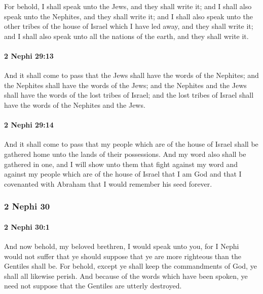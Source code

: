 			For behold, I shall speak unto the Jews, and they shall write it;
			and I shall also speak unto the Nephites, and they shall write it;
			and I shall also speak unto the other tribes of the house of Israel
			which I have led away,
			and they shall write it;
			and I shall also speak unto all the nations of the earth,
			and they shall write it.

		\paragraph{2 Nephi 29:13} %
			\label{2NEPHI-29-13}

			And it shall come to pass that the Jews shall have the words of the Nephites;
			and the Nephites shall have the words of the Jews;
			and the Nephites and the Jews shall have the words of the lost tribes of Israel;
			and the lost tribes of Israel shall have the words of the Nephites and the Jews.

		\paragraph{2 Nephi 29:14} %
			\label{2NEPHI-29-14}

			And it shall come to pass that
			my people which are of the house of Israel shall be gathered home
			unto the lands of their possessions.
			And my word also shall be gathered in one,
			and I will show unto them that fight against my word
			and against my people which are of the house of Israel
			that I am God and that I covenanted with Abraham
			that I would remember his seed forever.

	\subsubsection{2 Nephi 30} %
		\label{2NEPHI-30}
		
		\paragraph{2 Nephi 30:1} %
			\label{2NEPHI-30-1}

			And now behold, my beloved brethren, I would speak unto you,
			for I Nephi would not suffer that ye should suppose
			that ye are more righteous than the Gentiles shall be.
			For behold, except ye shall keep the commandments of God,
			ye shall all likewise perish.
			And because of the words which have been spoken,
			ye need not suppose that the Gentiles are utterly destroyed.

